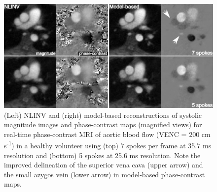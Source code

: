 \begin{figure}[tb]
  \centering
  \includegraphics[width=\textwidth]{fig/mir-pc-vol-7s-5s.png}
  \caption{(Left) NLINV and (right) model-based reconstructions of systolic magnitude images and phase-contrast maps (magnified views) for real-time phase-contrast MRI of aortic blood flow (VENC = 200 cm s\textsuperscript{-1}) in a healthy volunteer using (top) 7 spokes per frame at 35.7 ms resolution and (bottom) 5 spokes at 25.6 ms resolution. Note the improved delineation of the superior vena cava (upper arrow) and the small azygos vein (lower arrow) in model-based phase-contrast maps.} \label{Fig:mir-pc-vol-7s-5s}
\end{figure}

